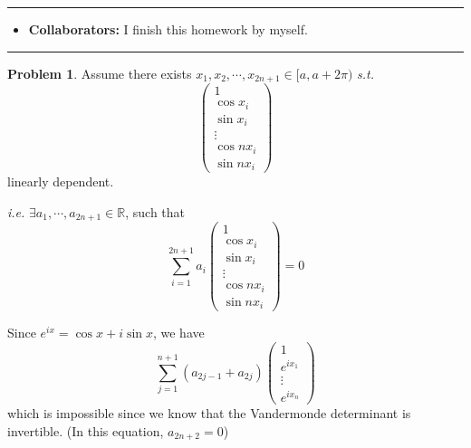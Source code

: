 \documentclass[a4paper]{article}
\theoremstyle{definition}
\newtheorem{problem}{Problem}
\theoremstyle{plain}
\newcommand{\Rbb}{\mathbb R}
\numberwithin{equation}{problem}
\newcommand{\ie}{ \textit{ i.e. } }
\newcommand{\st}{ \textit{ s.t. }}
\begin{document}
\courseheader
{}
\rule{\textwidth}{1pt}
\begin{itemize}
\item {\bf Collaborators: \/}
  I finish this homework by myself. 
\end{itemize}
\rule{\textwidth}{1pt}

\vspace{2em}

\sloppy
{}

\begin{problem}
    Assume there exists  $ x_1,x_2,\cdots,x_{2n+1}\in [a,a+2\pi) $ \st    
    \[\begin{pmatrix}
        1\\
        \cos x_i\\
        \sin x_i\\
        \vdots\\
        \cos nx_i\\
        \sin nx_i
    \end{pmatrix}\]
    linearly dependent.

    \ie  $ \exists  a_1,\cdots,a_{2n+1}\in \Rbb $, such that 
    \[\sum_{i=1}^{2n+1}a_i \begin{pmatrix}
        1\\
        \cos x_i\\
        \sin x_i\\
        \vdots\\
        \cos nx_i\\
        \sin nx_i
    \end{pmatrix}=0\]

    Since  $ e^{i x}=\cos x+i\sin x $, we have 
    \[\sum_{j=1}^{n+1}(a_{2j-1}+a_{2j})\begin{pmatrix}
        1\\
        e^{ix_1}\\
        \vdots\\
        e^{ix_n}
    \end{pmatrix}\]
    which is impossible since we know that the Vandermonde determinant is invertible. (In this equation,  $ a_{2n+2}=0 $)

\end{problem}
\end{document}
